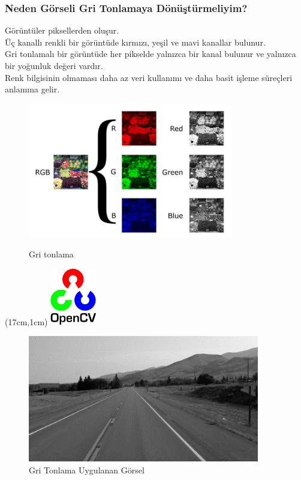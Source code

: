 \documentclass{article}
\begin{document}
\subsubsection{Neden Görseli Gri Tonlamaya Dönüştürmeliyim?}
Görüntüler piksellerden oluşur.\\[2pt]
Üç kanallı renkli bir görüntüde kırmızı, yeşil ve mavi kanallar bulunur.\\[2pt]
Gri tonlamalı bir görüntüde her pikselde yalnızca bir kanal bulunur ve yalnızca bir yoğunluk değeri vardır.\\[2pt]
Renk bilgisinin olmaması daha az veri kullanımı ve daha basit işleme süreçleri anlamına gelir.\\[2pt]
\begin{figure}[h]
  \centering
  \includegraphics[width=0.8\textwidth]{image/Resim20.png} %
  \label{fig:python18} 
  \caption{Gri tonlama \cite{mordvintsev2014opencv}}
\end{figure}
\newpage
\begin{textblock*}{5cm}(17cm,1cm) %
    \includegraphics[width=2cm]{image/Resim17.png} %
\end{textblock*}
\begin{figure}[h]
  \centering
  \includegraphics[width=0.9\textwidth]{image/Resim21.png} %
  \caption{Gri Tonlama Uygulanan Görsel}
  \label{fig:python19}  
\end{figure}
\end{document}
